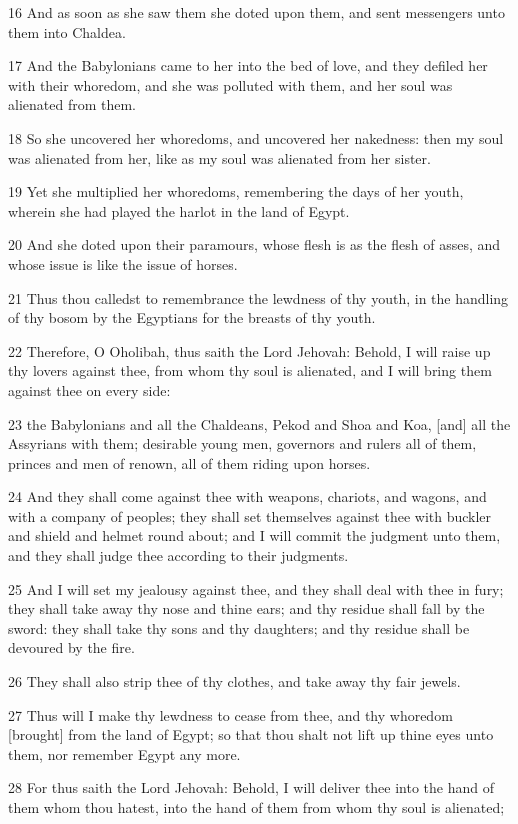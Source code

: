 \par 16 And as soon as she saw them she doted upon them, and sent messengers unto them into Chaldea.
\par 17 And the Babylonians came to her into the bed of love, and they defiled her with their whoredom, and she was polluted with them, and her soul was alienated from them.
\par 18 So she uncovered her whoredoms, and uncovered her nakedness: then my soul was alienated from her, like as my soul was alienated from her sister.
\par 19 Yet she multiplied her whoredoms, remembering the days of her youth, wherein she had played the harlot in the land of Egypt.
\par 20 And she doted upon their paramours, whose flesh is as the flesh of asses, and whose issue is like the issue of horses.
\par 21 Thus thou calledst to remembrance the lewdness of thy youth, in the handling of thy bosom by the Egyptians for the breasts of thy youth.
\par 22 Therefore, O Oholibah, thus saith the Lord Jehovah: Behold, I will raise up thy lovers against thee, from whom thy soul is alienated, and I will bring them against thee on every side:
\par 23 the Babylonians and all the Chaldeans, Pekod and Shoa and Koa, [and] all the Assyrians with them; desirable young men, governors and rulers all of them, princes and men of renown, all of them riding upon horses.
\par 24 And they shall come against thee with weapons, chariots, and wagons, and with a company of peoples; they shall set themselves against thee with buckler and shield and helmet round about; and I will commit the judgment unto them, and they shall judge thee according to their judgments.
\par 25 And I will set my jealousy against thee, and they shall deal with thee in fury; they shall take away thy nose and thine ears; and thy residue shall fall by the sword: they shall take thy sons and thy daughters; and thy residue shall be devoured by the fire.
\par 26 They shall also strip thee of thy clothes, and take away thy fair jewels.
\par 27 Thus will I make thy lewdness to cease from thee, and thy whoredom [brought] from the land of Egypt; so that thou shalt not lift up thine eyes unto them, nor remember Egypt any more.
\par 28 For thus saith the Lord Jehovah: Behold, I will deliver thee into the hand of them whom thou hatest, into the hand of them from whom thy soul is alienated;
